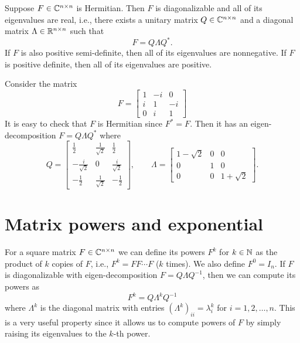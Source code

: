 \begin{lemma}
    Suppose $F \in \mathbb{C}^{n \times n}$ is Hermitian. 
    Then $F$ is diagonalizable and all of its eigenvalues are real, i.e., 
    there exists a unitary matrix $Q \in \mathbb{C}^{n \times n}$ and a diagonal matrix $\Lambda \in \mathbb{R}^{n \times n}$ such that
    \begin{equation*}
        F = Q \Lambda Q^*.
    \end{equation*}
    If $F$ is also positive semi-definite, then all of its eigenvalues are nonnegative. If $F$ is positive definite, then all of its eigenvalues are positive.
\end{lemma}

\begin{example}
    Consider the matrix 
    \begin{equation*}
        F = \begin{bmatrix}
            1 & - i & 0 \\ 
            i & 1 & -i \\ 
            0 & i & 1
        \end{bmatrix}
    \end{equation*}
    It is easy to check that $F$ is Hermitian since $F^* = F$. Then it has an eigen-decomposition $F = Q \Lambda Q^*$ where
    \begin{equation*}
        Q =  \begin{bmatrix}
            \frac12 & \frac{1}{\sqrt{2}} & \frac12 \\
            -\frac{i}{\sqrt{2}} & 0 & \frac{i}{\sqrt{2}} \\
            - \frac12 & \frac{1}{\sqrt{2}} & -\frac12
        \end{bmatrix}, \qquad
        \Lambda = \begin{bmatrix}
            1 - \sqrt{2} & 0 & 0 \\
            0 & 1 & 0 \\
            0 & 0 & 1 + \sqrt{2}
        \end{bmatrix}.
    \end{equation*}
\end{example}


\section{Matrix powers and exponential}
For a square matrix $F \in \mathbb{C}^{n \times n}$ we can define its powers $F^k$ for $k \in \mathbb{N}$ as the product of $k$ copies of $F$, i.e., $F^k = F F \cdots F$ ($k$ times). We also define $F^0 = I_n$. If $F$ is diagonalizable with eigen-decomposition $F = Q \Lambda Q^{-1}$, then we can compute its powers as
\begin{equation*}
    F^k = Q \Lambda^k Q^{-1}
\end{equation*}
where $\Lambda^k$ is the diagonal matrix with entries $(\Lambda^k)_{ii} = \lambda_i^k$ for $i=1,2,\ldots,n$. This is a very useful property since it allows us to compute powers of $F$ by simply raising its eigenvalues to the $k$-th power.

